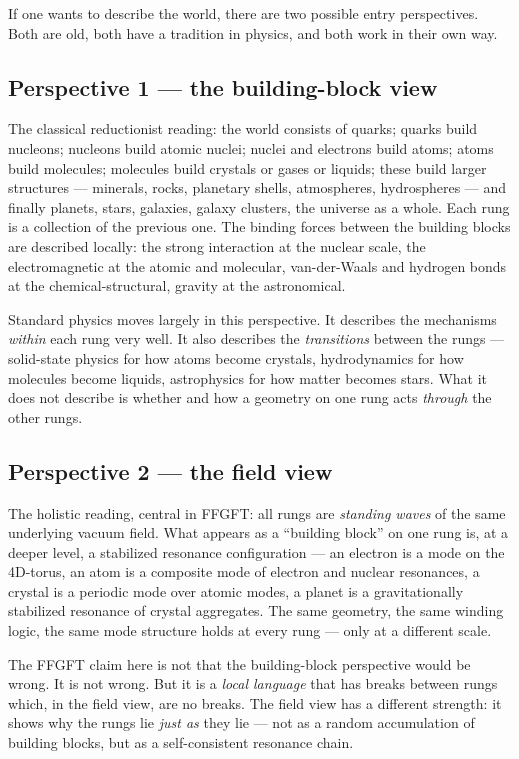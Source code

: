 If one wants to describe the world, there are two possible entry
perspectives. Both are old, both have a tradition in physics, and
both work in their own way.

\subsection*{Perspective 1 --- the building-block view}

The classical reductionist reading: the world consists of quarks;
quarks build nucleons; nucleons build atomic nuclei; nuclei and
electrons build atoms; atoms build molecules; molecules build
crystals or gases or liquids; these build larger structures ---
minerals, rocks, planetary shells, atmospheres, hydrospheres --- and
finally planets, stars, galaxies, galaxy clusters, the universe as a
whole. Each rung is a collection of the previous one. The binding
forces between the building blocks are described locally: the strong
interaction at the nuclear scale, the electromagnetic at the atomic
and molecular, van-der-Waals and hydrogen bonds at the
chemical-structural, gravity at the astronomical.

Standard physics moves largely in this perspective. It describes the
mechanisms \emph{within} each rung very well. It also describes the
\emph{transitions} between the rungs --- solid-state physics for how
atoms become crystals, hydrodynamics for how molecules become
liquids, astrophysics for how matter becomes stars. What it does
not describe is whether and how a geometry on one rung acts
\emph{through} the other rungs.

\subsection*{Perspective 2 --- the field view}

The holistic reading, central in FFGFT: all rungs are \emph{standing
waves} of the same underlying vacuum field. What appears as a
``building block'' on one rung is, at a deeper level, a stabilized
resonance configuration --- an electron is a mode on the 4D-torus, an
atom is a composite mode of electron and nuclear resonances, a
crystal is a periodic mode over atomic modes, a planet is a
gravitationally stabilized resonance of crystal aggregates. The same
geometry, the same winding logic, the same mode structure holds at
every rung --- only at a different scale.

The FFGFT claim here is not that the building-block perspective
would be wrong. It is not wrong. But it is a \emph{local language}
that has breaks between rungs which, in the field view, are no
breaks. The field view has a different strength: it shows why the
rungs lie \emph{just as} they lie --- not as a random accumulation
of building blocks, but as a self-consistent resonance chain.

